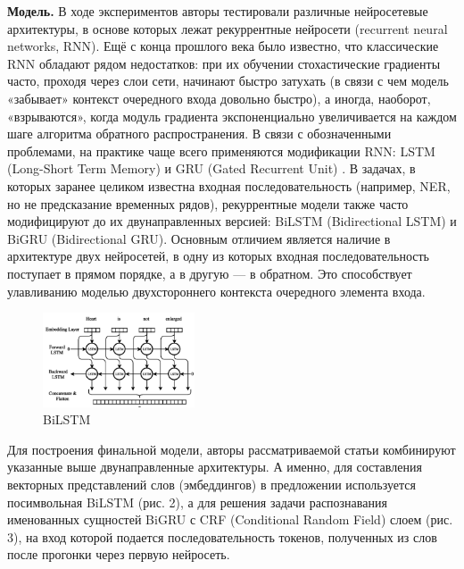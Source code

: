 \documentclass[12pt,a4paper]{article}
\begin{document}
\textbf{Модель.} В ходе экспериментов авторы тестировали различные нейросетевые архитектуры, в основе которых лежат рекуррентные нейросети (recurrent neural networks, RNN). Ещё с конца прошлого века было известно, что классические RNN обладают рядом недостатков: при их обучении стохастические градиенты часто, проходя через слои сети, начинают быстро затухать (в связи с чем модель «забывает» контекст очередного входа довольно быстро), а иногда, наоборот, «взрываются», когда модуль градиента экспоненциально увеличивается на каждом шаге алгоритма обратного распространения. В связи с обозначенными проблемами, на практике чаще всего применяются модификации RNN: LSTM (Long-Short Term Memory) \cite{lstm}  и GRU (Gated Recurrent Unit) \cite{gru}. В задачах, в которых заранее целиком известна входная последовательность (например, NER, но не предсказание временных рядов), рекуррентные модели также часто модифицируют до их двунаправленных версией: BiLSTM (Bidirectional LSTM) и BiGRU (Bidirectional GRU). Основным отличием является наличие в архитектуре двух нейросетей, в одну из которых входная последовательность поступает в прямом порядке, а в другую --- в обратном. Это способствует улавливанию моделью двухстороннего контекста очередного элемента входа. 

\begin{figure}[H]
\begin{center}
  \includegraphics[width=0.4\textwidth]{bilstm.png}
  \caption{BiLSTM}
\end{center}
\end{figure}

Для построения финальной модели, авторы рассматриваемой статьи комбинируют указанные выше двунаправленные архитектуры. А именно, для составления векторных представлений слов (эмбеддингов) в предложении используется посимвольная BiLSTM (рис. 2), а для решения задачи распознавания именованных сущностей BiGRU с CRF\cite{crf} (Conditional Random Field) слоем (рис. 3), на вход которой подается последовательность токенов, полученных из слов после прогонки через первую нейросеть.
\end{document}
